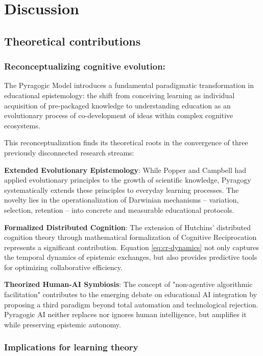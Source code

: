 \chapter{Discussion}
\label{discussion}

\section{Theoretical contributions}
\subsection*{Reconceptualizing cognitive evolution:}

The Pyragogic Model introduces a fundamental paradigmatic transformation in educational epistemology: the shift from conceiving learning as individual acquisition of pre-packaged knowledge to understanding education as an evolutionary process of co-development of ideas within complex cognitive ecosystems.

This reconceptualization finds its theoretical roots in the convergence of three previously disconnected research streams:

\textbf{Extended Evolutionary Epistemology}: While Popper \cite{Popper1972} and Campbell \cite{Campbell1974} had applied evolutionary principles to the growth of scientific knowledge, Pyragogy systematically extends these principles to everyday learning processes. The novelty lies in the operationalization of Darwinian mechanisms -- variation, selection, retention -- into concrete and measurable educational protocols.

\textbf{Formalized Distributed Cognition}: The extension of Hutchins' \cite{Hutchins1995} distributed cognition theory through mathematical formalization of Cognitive Reciprocation represents a significant contribution. Equation \ref{eq:cr-dynamics} not only captures the temporal dynamics of epistemic exchanges, but also provides predictive tools for optimizing collaborative efficiency.

\textbf{Theorized Human-AI Symbiosis}: The concept of "non-agentive algorithmic facilitation" contributes to the emerging debate on educational AI integration by proposing a third paradigm beyond total automation and technological rejection. Pyragogic AI neither replaces nor ignores human intelligence, but amplifies it while preserving epistemic autonomy.

\subsection{Implications for learning theory}


